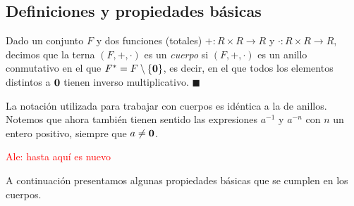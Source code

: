 \subsection{Definiciones y propiedades básicas}
\begin{definition}[Cuerpo]
Dado un conjunto $F$ y dos funciones (totales) $+ \colon R \times R \to R$ y $\cdot \colon R \times R \to R$, decimos que la terna $(F, +, \cdot)$ es un \emph{cuerpo} si $(F, +, \cdot)$ es un anillo conmutativo en el que $F^\ast = F \setminus \{\mathbf{0}\}$, es decir, en el que todos los elementos distintos a $\mathbf{0}$ tienen inverso multiplicativo. 
\hfill$\blacksquare$
\end{definition}

La notación utilizada para trabajar con cuerpos es idéntica a la de anillos. Notemos que ahora también tienen sentido las expresiones $a^{-1}$ y $a^{-n}$ con $n$ un entero positivo, siempre que $a \neq \mathbf{0}$.


\textcolor{red}{Ale: hasta aquí es nuevo}

A continuación presentamos algunas propiedades básicas que se cumplen
en los cuerpos.


